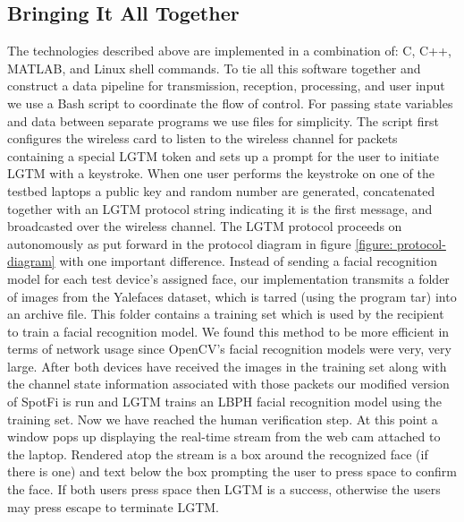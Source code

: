 \documentclass[12pt]{report}
\begin{document}

\subsection{Bringing It All Together}
The technologies described above are implemented in a combination of: C, C++, MATLAB, and Linux shell commands. To tie all this software together and construct a data pipeline for transmission, reception, processing, and user input we use a Bash script to coordinate the flow of control. For passing state variables and data between separate programs we use files for simplicity. The script first configures the wireless card to listen to the wireless channel for packets containing a special LGTM token and sets up a prompt for the user to initiate LGTM with a keystroke. When one user performs the keystroke on one of the testbed laptops a public key and random number are generated, concatenated together with an LGTM protocol string indicating it is the first message, and broadcasted over the wireless channel. The LGTM protocol proceeds on autonomously as put forward in the protocol diagram in figure \ref{figure: protocol-diagram} with one important difference. Instead of sending a facial recognition model for each test device's assigned face, our implementation transmits a folder of images from the Yalefaces dataset, which is tarred (using the program tar) into an archive file. This folder contains a training set which is used by the recipient to train a facial recognition model. We found this method to be more efficient in terms of network usage since OpenCV's facial recognition models were very, very large. After both devices have received the images in the training set along with the channel state information associated with those packets our modified version of SpotFi is run and LGTM trains an LBPH facial recognition model using the training set. Now we have reached the human verification step. At this point a window pops up displaying the real-time stream from the web cam attached to the laptop. Rendered atop the stream is a box around the recognized face (if there is one) and text below the box prompting the user to press space to confirm the face. If both users press space then LGTM is a success, otherwise the users may press escape to terminate LGTM. \par


\end{document}
